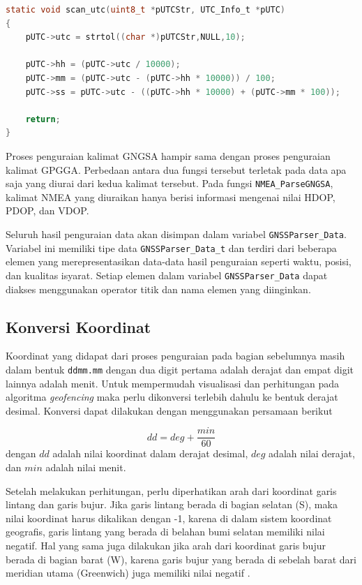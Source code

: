 \vspace{0.3cm}
\begin{lstlisting}[language=c, style=mystyle, caption={Konversi Waktu UTC}, label={lst: 3-scan-utc}]
static void scan_utc(uint8_t *pUTCStr, UTC_Info_t *pUTC)
{
	pUTC->utc = strtol((char *)pUTCStr,NULL,10);
	
	pUTC->hh = (pUTC->utc / 10000);
	pUTC->mm = (pUTC->utc - (pUTC->hh * 10000)) / 100;
	pUTC->ss = pUTC->utc - ((pUTC->hh * 10000) + (pUTC->mm * 100));
	
	return;
}
\end{lstlisting}

Proses penguraian kalimat GNGSA hampir sama dengan proses penguraian kalimat GPGGA. Perbedaan antara dua fungsi tersebut terletak pada data apa saja yang diurai dari kedua kalimat tersebut. Pada fungsi \texttt{NMEA\_ParseGNGSA}, kalimat NMEA yang diuraikan hanya berisi informasi mengenai nilai HDOP, PDOP, dan VDOP.

Seluruh hasil penguraian data akan disimpan dalam variabel \texttt{GNSSParser\_Data}. Variabel ini memiliki tipe data \texttt{GNSSParser\_Data\_t} dan terdiri dari beberapa elemen yang merepresentasikan data-data hasil penguraian seperti waktu, posisi, dan kualitas isyarat. Setiap elemen dalam variabel \texttt{GNSSParser\_Data} dapat diakses menggunakan operator titik dan nama elemen yang diinginkan.

\subsection{Konversi Koordinat}
Koordinat yang didapat dari proses penguraian pada bagian sebelumnya masih dalam bentuk \texttt{ddmm.mm} dengan dua digit pertama adalah derajat dan empat digit lainnya adalah menit. Untuk mempermudah visualisasi dan perhitungan pada algoritma \textit{geofencing} maka perlu dikonversi terlebih dahulu ke bentuk derajat desimal. Konversi dapat dilakukan dengan menggunakan persamaan berikut

\begin{equation}
	dd = deg + \frac{min}{60} 
\end{equation}
dengan $dd$ adalah nilai koordinat dalam derajat desimal, $deg$ adalah nilai derajat, dan $min$ adalah nilai menit.

Setelah melakukan perhitungan, perlu diperhatikan arah dari koordinat garis lintang dan garis bujur. Jika garis lintang berada di bagian selatan (S), maka nilai koordinat harus dikalikan dengan -1, karena di dalam sistem koordinat geografis, garis lintang yang berada di belahan bumi selatan memiliki nilai negatif. Hal yang sama juga dilakukan jika arah dari koordinat garis bujur berada di bagian barat (W), karena garis bujur yang berada di sebelah barat dari meridian utama (Greenwich) juga memiliki nilai negatif \cite{AlHindawi2012}.

